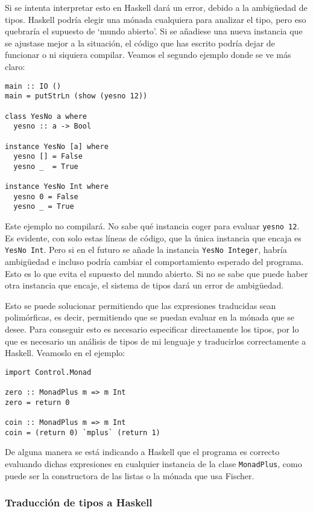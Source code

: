 \documentclass[class=article, crop=false]{standalone}
\begin{document}
Si se intenta interpretar esto en Haskell dará un error, debido a la ambigüedad de tipos.
Haskell podría elegir una mónada cualquiera para analizar el tipo, pero eso quebraría el
supuesto de `mundo abierto'. Si se añadiese una nueva instancia que se ajustase mejor a la
situación, el código que has escrito podría dejar de funcionar o ni siquiera compilar. Veamos
el segundo ejemplo donde se ve más claro\cite{Lipovaca:2011:LYH:2018642}:

\begin{verbatim}
main :: IO ()
main = putStrLn (show (yesno 12))

class YesNo a where
  yesno :: a -> Bool
  
instance YesNo [a] where
  yesno [] = False
  yesno _  = True

instance YesNo Int where
  yesno 0 = False
  yesno _ = True
\end{verbatim}

Este ejemplo no compilará. No sabe qué instancia coger para evaluar \verb`yesno 12`. Es
evidente, con solo estas líneas de código, que la única instancia que encaja es
\verb`YesNo Int`. Pero si en el futuro se añade la instancia \verb`YesNo Integer`, habría
ambigüedad e incluso podría cambiar el comportamiento esperado del programa. Esto es lo que
evita el supuesto del mundo abierto. Si no se sabe que puede haber otra instancia que encaje,
el sistema de tipos dará un error de ambigüedad.

Esto se puede solucionar permitiendo que las expresiones traducidas sean polimórficas, es
decir, permitiendo que se puedan evaluar en la mónada que se desee. Para conseguir esto es
necesario especificar directamente los tipos, por lo que es necesario un análisis de tipos de
mi lenguaje y traducirlos correctamente a Haskell. Veamoslo en el ejemplo:

\begin{verbatim}
import Control.Monad

zero :: MonadPlus m => m Int
zero = return 0

coin :: MonadPlus m => m Int
coin = (return 0) `mplus` (return 1)
\end{verbatim}

De alguna manera se está indicando a Haskell que el programa es correcto evaluando dichas
expresiones en cualquier instancia de la clase \verb`MonadPlus`, como puede ser la
constructora de las listas o la mónada que usa Fischer.

\subsubsection{Traducción de tipos a Haskell}
\end{document}
